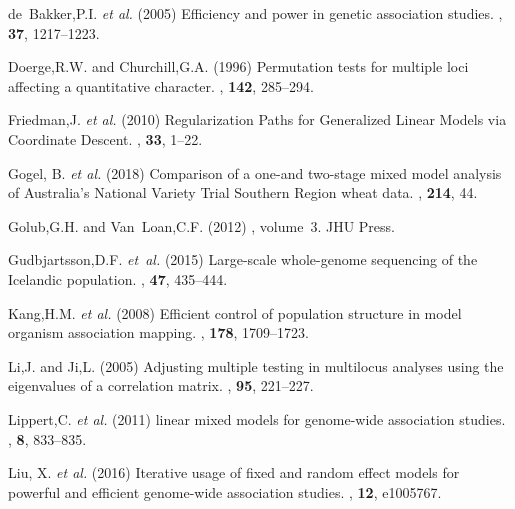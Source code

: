 \documentclass{bioinfo}
\begin{document}
\begin{thebibliography}{}
de~Bakker,P.I. \textit{et al.} (2005)
\newblock Efficiency and power in genetic association studies.
, {\bf 37}, 1217--1223.

Doerge,R.W. and Churchill,G.A. (1996)
\newblock Permutation tests for multiple loci affecting a quantitative
  character.
, {\bf 142}, 285--294.



Friedman,J. \textit{et al.} (2010)
\newblock Regularization {P}aths for {G}eneralized {L}inear {M}odels via
  {C}oordinate {D}escent.
, {\bf 33}, 1--22.

Gogel, B. \textit{et al.} (2018)
\newblock Comparison of a one-and two-stage mixed model analysis of
  {A}ustralia's {N}ational {V}ariety {T}rial {S}outhern {R}egion wheat data.
, {\bf 214}, 44.

Golub,G.H. and Van~Loan,C.F. (2012)
, volume~3.
\newblock JHU Press.

Gudbjartsson,D.F.  {\em et~al.} (2015)
\newblock Large-scale whole-genome sequencing of the {I}celandic population.
, {\bf 47}, 435--444.

Kang,H.M. \textit{et al.} (2008)
\newblock Efficient control of population structure in model organism
  association mapping.
, {\bf 178}, 1709--1723.

Li,J. and Ji,L. (2005)
\newblock Adjusting multiple testing in multilocus analyses using the
  eigenvalues of a correlation matrix.
, {\bf 95}, 221--227.

Lippert,C. \textit{et al.} (2011)
 linear mixed models for genome-wide association studies.
, {\bf 8}, 833--835.


Liu, X. \textit{et al.} (2016)
\newblock Iterative usage of fixed and random effect models for powerful and
  efficient genome-wide association studies.
, {\bf 12}, e1005767.


\end{thebibliography}
\end{document}
